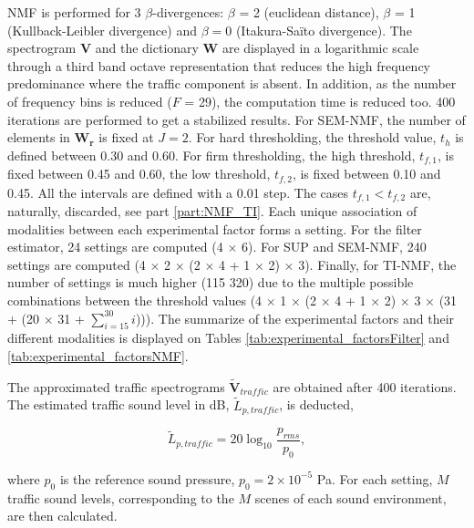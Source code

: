 \documentclass[review,5p,twocolumn,sort&compress,times]{elsarticle}
\begin{document}
NMF is performed for 3 $\beta$-divergences: $\beta$ = 2 (euclidean distance), $\beta$ = 1 (Kullback-Leibler divergence) and $\beta = 0$ (Itakura-Sa\"ito divergence). The spectrogram $\mathbf{V}$ and the dictionary $\mathbf{W}$ are displayed in a logarithmic scale through a third band octave representation that reduces the high frequency predominance where the traffic component is absent. In addition, as the number of frequency bins is reduced ($F$ = 29), the computation time is reduced too. 400 iterations are performed to get a stabilized results. For SEM-NMF, the number of elements in $\mathbf{W_r}$ is fixed at $J = 2$. For hard thresholding, the threshold value, $t_h$ is defined between 0.30 and 0.60. For firm thresholding, the high threshold, $t_{f,1}$, is fixed between 0.45 and 0.60, the low threshold, $t_{f,2}$, is fixed between 0.10 and 0.45. All the intervals are defined with a 0.01 step. The cases $t_{f,1} < t_{f,2}$ are, naturally, discarded, see part \ref{part:NMF_TI}.
Each unique association of modalities between each experimental factor forms a setting. For the filter estimator, 24 settings are computed (4 $\times$ 6). For SUP and SEM-NMF, 240 settings are computed (4 $\times$ 2 $\times$ (2 $\times$ 4 + 1 $\times$ 2) $\times$ 3). Finally, for TI-NMF, the number of settings is much higher (115 320) due to the multiple possible combinations between the threshold values (4 $\times$ 1 $\times$ (2 $\times$ 4 + 1 $\times$ 2) $\times$ 3 $\times$ (31 + (20 $\times$ 31 + $\sum_{i = 15}^{30} i $))).
The summarize of the experimental factors and their different modalities is displayed on Tables \ref{tab:experimental_factorsFilter} and \ref{tab:experimental_factorsNMF}. 

The approximated traffic spectrograms $\mathbf{\tilde{V}}_{traffic}$ are obtained after 400 iterations. The estimated traffic sound level in dB, $\tilde{L}_{p, traffic}$, is deducted, 

\begin{equation}
\tilde{L}_{p, traffic} = 20\log_{10}\frac{p_{rms}}{p_0}, 
\end{equation}

where $p_0$ is the reference sound pressure, $p_0 = 2\times 10^{-5}$ Pa. For each setting, $M$ traffic sound levels, corresponding to the $M$ scenes of each sound environment, are then calculated. 
\end{document}
